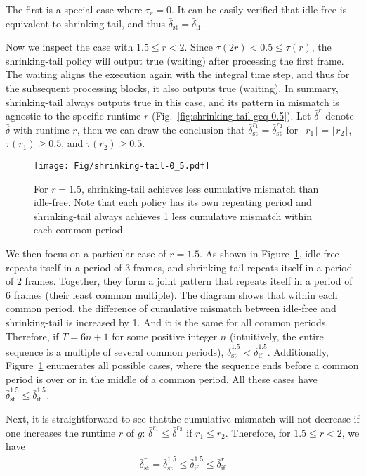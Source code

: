  The first is a special case where $\tau_r = 0$. It can be easily verified that idle-free is equivalent to shrinking-tail, and thus $\bar{\delta}_{\text{st}} = \bar{\delta}_{\text{if}}$.


Now we inspect the case with $1.5 \leq r < 2$. Since $\tau(2r) < 0.5 \leq \tau(r)$, the shrinking-tail policy will output true (waiting) after processing the first frame. The waiting aligns the execution again with the integral time step, and thus for the subsequent processing blocks, it also outputs true (waiting). In summary, shrinking-tail always outputs true in this case, and its pattern in mismatch is agnostic to the specific runtime $r$ (Fig.~\ref{fig:shrinking-tail-geq-0.5}). Let $\bar{\delta}^r$ denote $\bar{\delta}$  with runtime $r$,
then we can draw the conclusion that 
$\bar{\delta}_{\text{st}}^{r_1} = \bar{\delta}_{\text{st}}^{r_2}$ for $\lfloor r_1 \rfloor = \lfloor r_2 \rfloor$, $\tau(r_1) \geq 0.5$, and $\tau(r_2) \geq 0.5$.

\begin{figure}[!b]
\centering
\texttt{[image: Fig/shrinking-tail-0\_5.pdf]}

\caption{For $r = 1.5$, shrinking-tail achieves less cumulative mismatch than idle-free. Note that each policy has its own repeating period and shrinking-tail always achieves 1 less cumulative mismatch within each common period.
}
\label{fig:shrinking-tail-0.5}
\end{figure}

We then focus on a particular case of $r = 1.5$. As shown in Figure~\ref{fig:shrinking-tail-0.5}, idle-free repeats itself in a period of 3 frames, and shrinking-tail repeats itself in a period of 2 frames. Together, they form a joint pattern that repeats itself in a period of 6 frames (their least common multiple). The diagram shows that within each common period, the difference of cumulative mismatch between idle-free and shrinking-tail is increased by 1. And it is the same for all common periods. Therefore, if $T = 6n + 1$ for some positive integer $n$ (intuitively, the entire sequence is a multiple of several common periods), $\bar{\delta}_{\text{st}}^{1.5} < \bar{\delta}_{\text{if}}^{1.5}$. Additionally, Figure~\ref{fig:shrinking-tail-0.5} enumerates all possible cases, where the sequence ends before a common period is over or in the middle of a common period. All these cases have $\bar{\delta}_{\text{st}}^{1.5} \leq \bar{\delta}_{\text{if}}^{1.5}$. 

Next, it is straightforward to see thatthe cumulative mismatch will not decrease if one increases the runtime $r$ of $g$: $\bar{\delta}^{r_1} \leq \bar{\delta}^{r_2}$ if $r_1 \leq r_2$. 
Therefore, for $1.5 \leq r < 2$, we have
\begin{align}
    \bar{\delta}_{\text{st}}^r = \bar{\delta}_{\text{st}}^{1.5} \leq \bar{\delta}_{\text{if}}^{1.5} \leq \bar{\delta}_{\text{if}}^r
\end{align}



